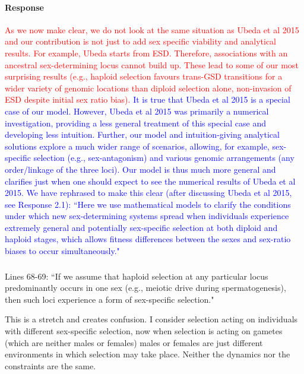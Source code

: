 \documentclass[10pt,letterpaper]{article}
\begin{document}
\noindent\paragraph{Response}
\textcolor{red}{As we now make clear, we do not look at the same situation as Ubeda et al 2015 and our contribution is not just to add sex specific viability and analytical results. 
For example, Ubeda starts from ESD. 
Therefore, associations with an ancestral sex-determining locus cannot build up. These lead to some of our most surprising results (e.g., haploid selection favours trans-GSD transitions for a wider variety of genomic locations than diploid selection alone, non-invasion of ESD despite initial sex ratio bias). }
\textcolor{blue}{It is true that Ubeda et al 2015 is a special case of our model. 
However, Ubeda et al 2015 was primarily a numerical investigation, providing a less general treatment of this special case and developing less intuition.
Further, our model and intuition-giving analytical solutions explore a much wider range of scenarios, allowing, for example, sex-specific selection (e.g., sex-antagonism) and various genomic arrangements (any order/linkage of the three loci).
Our model is thus much more general and clarifies just when one should expect to see the numerical results of Ubeda et al 2015.
We have rephrased to make this clear (after discussing Ubeda et al 2015, see Response 2.1): ``Here we use mathematical models to clarify the conditions under which new sex-determining systems spread when individuals experience extremely general and potentially sex-specific selection at both diploid and haploid stages, which allows fitness differences between the sexes and sex-ratio biases to occur simultaneously."
}

\noindent\subsubsection{}
Lines 68-69: ``If we assume that haploid selection at any particular locus predominantly occurs in one sex (e.g., meiotic drive during spermatogenesis), then such loci experience a form of sex-specific selection." 

This is a stretch and creates confusion. I consider selection acting on individuals with different sex-specific selection, now when selection is acting on gametes (which are neither males or females) males or females are just different environments in which selection may take place. Neither the dynamics nor the constraints are the same. 
\end{document}
